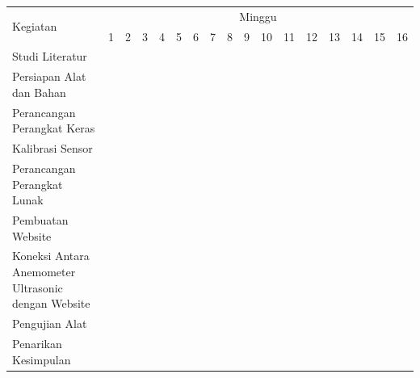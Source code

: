 \newcommand{\w}{}
\newcommand{\G}{\cellcolor{gray}}
\begin{table}[h!]
  \begin{tabular}{|p{3.5cm}|c|c|c|c|c|c|c|c|c|c|c|c|c|c|c|c|}

    \hline
    \multirow{2}{*}{Kegiatan} & \multicolumn{16}{|c|}{Minggu} \\
    \cline{2-17} &
    1 & 2 & 3 & 4 & 5 & 6 & 7 & 8 & 9 & 10 & 11 & 12 & 13 & 14 & 15 & 16 \\
    \hline

    Studi Literatur &
    \G & \w & \w & \w & \w & \w & \w & \w & \w & \w & \w & \w & \w & \w & \w & \w \\
    \hline

    Persiapan Alat dan Bahan &
    \w & \G & \G & \w & \w & \w & \w & \w & \w & \w & \w & \w & \w & \w & \w & \w \\
    \hline

    Perancangan Perangkat Keras &
    \w & \w & \w & \G & \G & \w & \w & \w & \w & \w & \w & \w & \w & \w & \w & \w \\
    \hline

    Kalibrasi Sensor &
    \w & \w & \w & \w & \w & \G & \G & \w & \w & \w & \w & \w & \w & \w & \w & \w \\
    \hline

    Perancangan Perangkat Lunak &
    \w & \w & \w & \w & \w & \w & \w & \G & \G & \w & \w & \w & \w & \w & \w & \w \\
    \hline

    Pembuatan Website &
    \w & \w & \w & \w & \w & \w & \w & \w & \w & \G & \G & \w & \w & \w & \w & \w \\
    \hline

    Koneksi Antara Anemometer Ultrasonic dengan Website &
    \w & \w & \w & \w & \w & \w & \w & \w & \w & \w & \w & \G & \w & \w & \w & \w \\
    \hline

    Pengujian Alat &
    \w & \w & \w & \w & \w & \w & \w & \w & \w & \w & \w & \w & \G & \G & \w & \w \\
    \hline

    Penarikan Kesimpulan &
    \w & \w & \w & \w & \w & \w & \w & \w & \w & \w & \w & \w & \w & \w & \G & \G \\
    \hline

  \end{tabular}
  \label{tbl:timeline}
\end{table}

